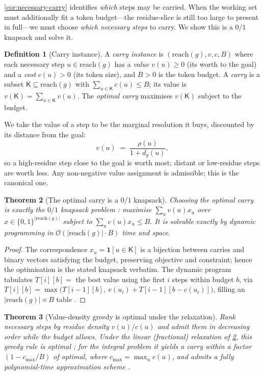 \documentclass[11pt,a4paper]{article}
\theoremstyle{thmstyle}
\newtheorem{theorem}{Theorem}[section]
\theoremstyle{definition}
\newtheorem{definition}[theorem]{Definition}
\theoremstyle{remark}
\newcommand{\res}{\rho}                 %
\newcommand{\goal}{g}                   %
\newcommand{\reach}{\mathrm{reach}}
\newcommand{\keep}{\mathsf{K}}
\newcommand{\budget}{B}
\newcommand{\val}{v}                    %
\newcommand{\cost}{c}                   %
\newcommand{\abs}[1]{\lvert#1\rvert}
\newcommand{\set}[1]{\{#1\}}
\begin{document}
\cref{cor:necessary-carry} identifies \emph{which} steps may be carried. When
the working set must additionally fit a token budget---the residue-slice is still
too large to present in full---we must choose \emph{which necessary steps} to
carry. We show this is a $0/1$ knapsack and solve it.

\begin{definition}[Carry instance]
\label{def:carry}
A \emph{carry instance} is $(\reach(\goal),\val,\cost,\budget)$ where each
necessary step $u\in\reach(\goal)$ has a \emph{value} $\val(u)\ge0$ (its worth to
the goal) and a \emph{cost} $\cost(u)>0$ (its token size), and $\budget>0$ is the
token budget. A \emph{carry} is a subset $\keep\subseteq\reach(\goal)$ with
$\sum_{u\in\keep}\cost(u)\le\budget$; its value is $\val(\keep)=\sum_{u\in\keep}\val(u)$.
The \emph{optimal carry} maximises $\val(\keep)$ subject to the budget.
\end{definition}

We take the value of a step to be the marginal resolution it buys, discounted by
its distance from the goal:
\[
\val(u)\;=\;\frac{\res(u)}{1+d_\goal(u)},
\]
so a high-residue step close to the goal is worth most; distant or low-residue
steps are worth less. Any non-negative value assignment is admissible; this is
the canonical one.

\begin{theorem}[The optimal carry is a $0/1$ knapsack]
\label{thm:knapsack}
Choosing the optimal carry is exactly the $0/1$ knapsack problem
\citep{dantzig1957,kellerer2004}: maximise $\sum_u \val(u)x_u$ over
$x\in\set{0,1}^{\abs{\reach(\goal)}}$ subject to $\sum_u\cost(u)x_u\le\budget$.
It is solvable exactly by dynamic programming in
$\mathcal{O}(\abs{\reach(\goal)}\cdot\budget)$ time and space.
\end{theorem}

\begin{proof}
The correspondence $x_u=\mathbf 1[u\in\keep]$ is a bijection between carries and
binary vectors satisfying the budget, preserving objective and constraint; hence
the optimisation is the stated knapsack verbatim. The dynamic program tabulates
$T[i][b]=$ the best value using the first $i$ steps within budget $b$, via
$T[i][b]=\max\bigl(T[i-1][b],\ \val(u_i)+T[i-1][b-\cost(u_i)]\bigr)$, filling an
$\abs{\reach(\goal)}\times\budget$ table \citep{nemhauser1988}.
\end{proof}

\begin{theorem}[Value-density greedy is optimal under the relaxation]
\label{thm:greedy}
Rank necessary steps by \emph{residue density} $\val(u)/\cost(u)$ and admit them
in decreasing order while the budget allows. Under the linear (fractional)
relaxation of \cref{thm:knapsack}, this greedy rule is optimal
\citep{dantzig1957}; for the integral problem it yields a carry within a factor
$(1-\cost_{\max}/\budget)$ of optimal, where $\cost_{\max}=\max_u\cost(u)$, and
admits a fully polynomial-time approximation scheme \citep{sahni1975}.
\end{theorem}
\end{document}

